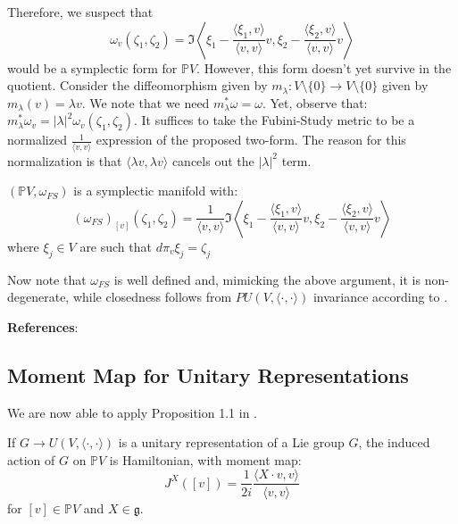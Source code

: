 \begin{remark}
Therefore, we suspect that $$\omega_{v}(\zeta_{1}, \zeta_{2}) = \Im \left\langle \xi_{1} - \frac{\langle \xi_{1}, v \rangle}{\langle v, v \rangle}v, \xi_{2} - \frac{\langle \xi_{2}, v \rangle}{\langle v, v \rangle}v \right\rangle$$ would be a symplectic form for $\mathbb{P} V$. However, this form doesn't yet survive in the quotient. Consider the diffeomorphism given by $m_{\lambda}: V \setminus \{0\} \to V \setminus \{0\}$ given by $m_{\lambda}(v) = \lambda v$. We note that we need $m_{\lambda}^{*} \omega = \omega$. Yet, observe that: $m_{\lambda}^{*} \omega_v = |\lambda|^2 \omega_{v}(\zeta_{1}, \zeta_{2})$. It suffices to take the Fubini-Study metric to be a normalized $\frac{1}{\langle v, v \rangle}$ expression of the proposed two-form. The reason for this normalization is that $\langle \lambda v, \lambda v \rangle$ cancels out the $|\lambda|^2$ term.
\end{remark}


\begin{lemma}
$(\mathbb{P} V, \omega_{FS})$ is a symplectic manifold with:
\begin{equation}
\left( \omega_{FS} \right)_{[v]}(\zeta_{1}, \zeta_{2}) = \frac{1}{\langle v, v \rangle} \Im \left\langle \xi_{1} - \frac{\langle \xi_{1}, v \rangle}{\langle v, v \rangle}v, \xi_{2} - \frac{\langle \xi_{2}, v \rangle}{\langle v, v \rangle}v \right\rangle 
\end{equation}
\noindent where $\xi_{j} \in V$ are such that $d \pi_{v} \xi_{j} = \zeta_{j}$
\end{lemma}

Now note that $\omega_{FS}$ is well defined and, mimicking the above argument, it is non-degenerate, while closedness follows from $PU(V, \langle \cdot, \cdot \rangle)$ invariance according to \textcite{Arnold2010}. \bigskip 

\noindent \textbf{References}: \textcite{Arnold2010}

\subsection{Moment Map for Unitary Representations}
We are now able to apply Proposition 1.1 in \textcite{Wildberger1992}. 

\begin{lemma}
If $G \to U(V, \langle \cdot, \cdot \rangle)$ is a unitary representation of a Lie group $G$, the induced action of $G$ on $\mathbb{P}V$ is Hamiltonian, with moment map: 
\begin{equation}
J^{X}([v]) = \frac{1}{2i} \frac{\langle X \cdot v, v \rangle}{\langle v, v \rangle}
\end{equation}
\noindent for \([v] \in \mathbb{P}V\) and \(X \in \mathfrak{g}\).
\end{lemma}


